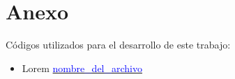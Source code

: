 \newpage
\section{Anexo}
    Códigos utilizados para el desarrollo de este trabajo:

    \begin{itemize}
        \item Lorem
            \href{link del jupyter a cierto commit}
            {\textcolor{blue}{nombre\_del\_archivo}}
    \end{itemize}